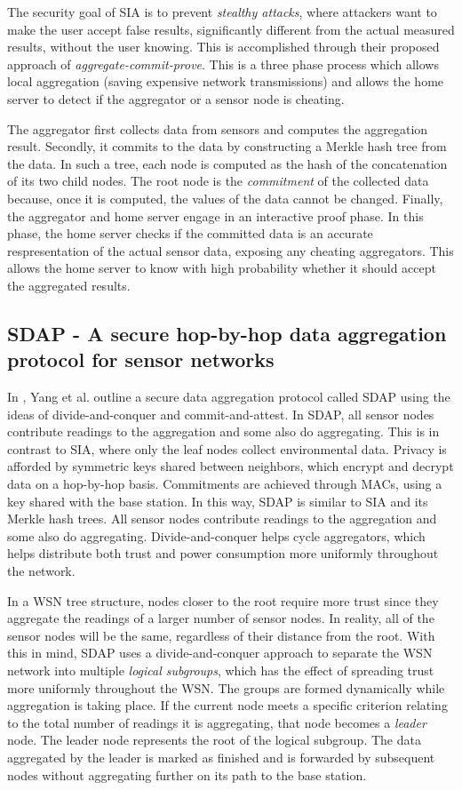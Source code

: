 \documentclass[a4paper]{article}
\begin{document}
The security goal of SIA is to prevent {\em stealthy attacks}, where attackers
want to make the user accept false results, significantly different from the
actual measured results, without the user knowing. This is accomplished
through their proposed approach of {\em aggregate-commit-prove}. This is a
three phase process which allows local aggregation (saving expensive network
transmissions) and allows the home server to detect if the aggregator or a
sensor node is cheating.

The aggregator first collects data from sensors and computes the aggregation
result. Secondly, it commits to the data by constructing a Merkle hash tree
from the data. In such a tree, each node is computed as the hash of the
concatenation of its two child nodes. The root node is the {\em commitment} of
the collected data because, once it is computed, the values of the data cannot
be changed. Finally, the aggregator and home server engage in an interactive
proof phase. In this phase, the home server checks if the committed data is an
accurate respresentation of the actual sensor data, exposing any cheating
aggregators. This allows the home server to know with high probability whether
it should accept the aggregated results.

\subsection{SDAP - A secure hop-by-hop data aggregation protocol for sensor networks}

In \cite{SDAP}, Yang et al. outline a secure data aggregation protocol called
SDAP using the ideas of divide-and-conquer and commit-and-attest. In SDAP, all
sensor nodes contribute readings to the aggregation and some also do
aggregating. This is in contrast to SIA, where only the leaf nodes collect
environmental data. Privacy is afforded by symmetric keys shared between
neighbors, which encrypt and decrypt data on a hop-by-hop basis. Commitments
are achieved through MACs, using a key shared with the base station. In this
way, SDAP is similar to SIA and its Merkle hash trees. All sensor nodes
contribute readings to the aggregation and some also do
aggregating. Divide-and-conquer helps cycle aggregators, which helps
distribute both trust and power consumption more uniformly throughout the
network.

In a WSN tree structure, nodes closer to the root require more trust since
they aggregate the readings of a larger number of sensor nodes. In reality,
all of the sensor nodes will be the same, regardless of their distance from
the root. With this in mind, SDAP uses a divide-and-conquer approach to
separate the WSN network into multiple {\em logical subgroups}, which has the
effect of spreading trust more uniformly throughout the WSN. The groups are
formed dynamically while aggregation is taking place. If the current node
meets a specific criterion relating to the total number of readings it is
aggregating, that node becomes a {\em leader} node. The leader node represents
the root of the logical subgroup. The data aggregated by the leader is marked
as finished and is forwarded by subsequent nodes without aggregating further
on its path to the base station.
\end{document}
